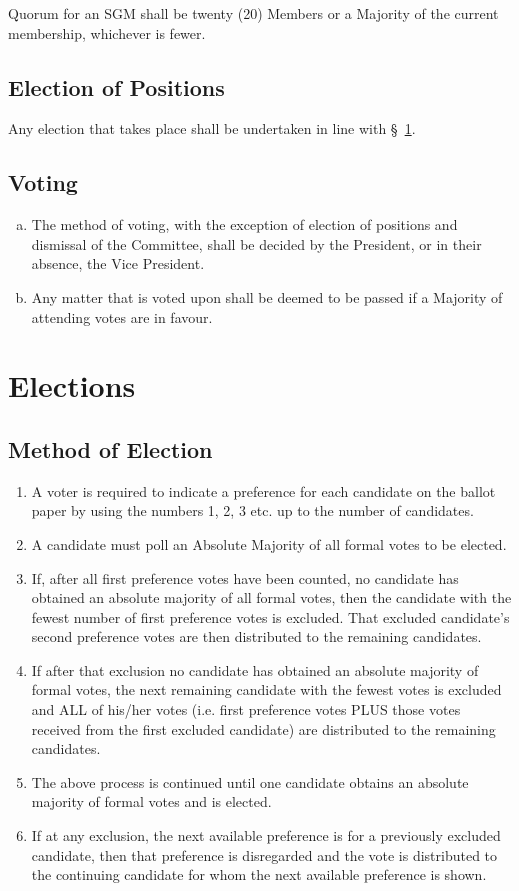 \documentclass[a4paper,12pt]{article}
\begin{document}
Quorum for an SGM shall be twenty (20) Members or a Majority of the current membership, whichever is fewer.

\subsection{Election of Positions}

Any election that takes place shall be undertaken in line with \S~\ref{elections}.

\subsection{Voting}

\begin{enumerate}[a)]
	\item The method of voting, with the exception of election of positions and dismissal of the Committee, shall be decided by the President, or in their absence, the Vice President.
	\item Any matter that is voted upon shall be deemed to be passed if a Majority of attending votes are in favour.
\end{enumerate}

\section{Elections}
\label{elections}

\subsection{Method of Election}

\begin{enumerate}
	\item A voter is required to indicate a preference for each candidate on the ballot paper by using the numbers 1, 2, 3 etc. up to the number of candidates.
	\item A candidate must poll an Absolute Majority of all formal votes to be elected.
	\item If, after all first preference votes have been counted, no candidate has obtained an absolute majority of all formal votes, then the candidate with the fewest number of first preference votes is excluded. That excluded candidate's second preference votes are then distributed to the remaining candidates.
	\item If after that exclusion no candidate has obtained an absolute majority of formal votes, the next remaining candidate with the fewest votes is excluded and ALL of his/her votes (i.e. first preference votes PLUS those votes received from the first excluded candidate) are distributed to the remaining candidates.
	\item The above process is continued until one candidate obtains an absolute majority of formal votes and is elected.
	\item If at any exclusion, the next available preference is for a previously excluded candidate, then that preference is disregarded and the vote is distributed to the continuing candidate for whom the next available preference is shown.
\end{enumerate}
\end{document}

